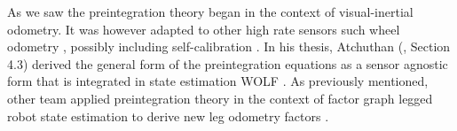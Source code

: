 As we saw the preintegration theory began in the context of visual-inertial odometry. It was however adapted to other high rate sensors such wheel odometry \cite{quan2019tightly}, 
possibly including self-calibration \cite{deray-19-selfcalib}. In his thesis, Atchuthan (\cite{atchuthan-18-thesis}, Section 4.3) derived the general form of the preintegration 
equations as a sensor agnostic form that is integrated in state estimation WOLF \cite{sola2021wolf}. As previously mentioned, other team applied preintegration theory in the 
context of factor graph legged robot state estimation to derive new leg odometry factors \cite{hartley2018legged, wisth2019robust, wisth2020preintegrated}.


